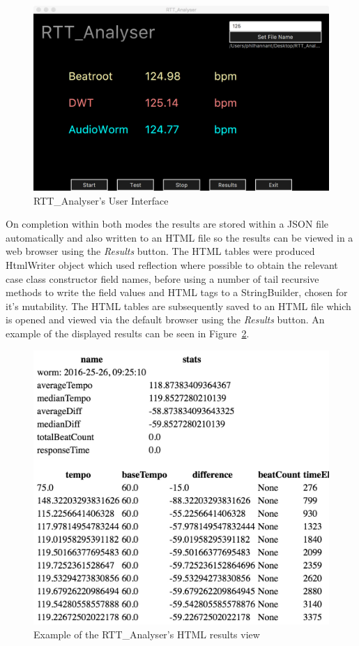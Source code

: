 \documentclass[a4paper, 11pt]{article}
\begin{document}
\begin{figure}[htbp]
\centering
\includegraphics[scale=0.25]{images/rtt.jpg}
\caption{RTT\_Analyser's User Interface}
\label{fig: rtt}
\end{figure}

On completion within both modes the results are stored within a JSON file automatically and also written to an HTML file so the results can be viewed in a web browser using the \textit{Results} button. The HTML tables were produced HtmlWriter object which used reflection where possible to obtain the relevant case class constructor field names, before using a number of tail recursive methods to write the field values and HTML tags to a StringBuilder, chosen for it's mutability. The HTML tables are subsequently saved to an HTML file which is opened and viewed via the default browser using the \textit{Results} button. An example of the displayed results can be seen in Figure~\ref{fig: htmlView}.

\begin{figure}[htbp]
\centering
\includegraphics[scale=0.3]{images/htmlResults.jpg}
\caption{Example of the RTT\_Analyser's HTML results view}
\label{fig: htmlView}
\end{figure}
\end{document}
